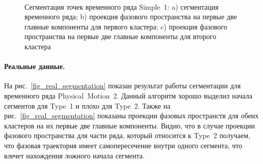 \begin{figure}[h!t]\center
{}
\\
\caption{Сегментация точек временного ряда Simple~1: 
a) сегментация временного ряда; b) проекция фазового пространства на первые две главные компоненты для первого кластера; c) проекция фазового пространства на первые две главные компоненты для второго кластера}
\label{fig_simple_segmentation}
\end{figure}

\paragraph{Реальные данные.} На рис.~\ref{fig_real_segmentation} показан результат работы сегментации для временного ряда Physical~Motion~2. 
Данный алгоритм хорошо выделил начала сегментов для Type~1 и плохо для Type~2. 
Также на рис.~\ref{fig_real_segmentation} показаны проекции фазовых пространств для обеих кластеров на их первые две главные компоненты. 
Видно, что в случае проекции фазового пространства для части ряда, который относится к Type~2 получаем, что фазовая траектория имеет самопересечение внутри одного сегмента, что влечет нахождения ложного начала сегмента.


